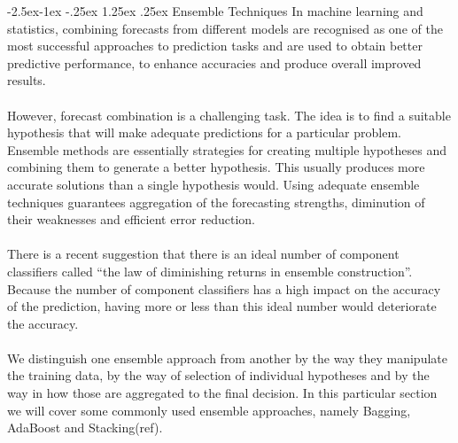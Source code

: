 \documentclass[runningheads,a4paper]{llncs}[2015/06/24]
\makeatletter
\renewcommand\paragraph{\@startsection{paragraph}{4}{\z@}%
            {-2.5ex\@plus -1ex \@minus -.25ex}%
            {1.25ex \@plus .25ex}%
            {\normalfont\normalsize\bfseries}}
\makeatother
\begin{document}
		 \paragraph{Ensemble Techniques}
In machine learning and statistics, combining forecasts from different models are recognised as one of the most successful approaches to prediction tasks and are used to obtain better predictive performance, to enhance accuracies and produce overall improved results. 
\\\\However, forecast combination is a challenging task. 
The idea is to find a suitable hypothesis that will make adequate predictions for a particular problem. Ensemble methods are essentially strategies for creating multiple hypotheses and combining them to generate a better hypothesis. This usually produces more accurate solutions than a single hypothesis would. Using adequate ensemble techniques guarantees aggregation of the forecasting strengths, diminution of their weaknesses and efficient error reduction.\\\\There is a recent suggestion that there is an ideal number of component classifiers called \enquote{the law of diminishing returns in ensemble construction}. 
Because the number of component classifiers has a high impact on the accuracy of the prediction, having more or less than this ideal number would deteriorate the accuracy. \\\\We distinguish one ensemble approach from another by the way they manipulate the training data, by the way of selection of individual hypotheses and by the way in how those are aggregated to the final decision. 
In this particular section we will cover some commonly used ensemble approaches, namely Bagging, AdaBoost and Stacking(ref).
\end{document}
